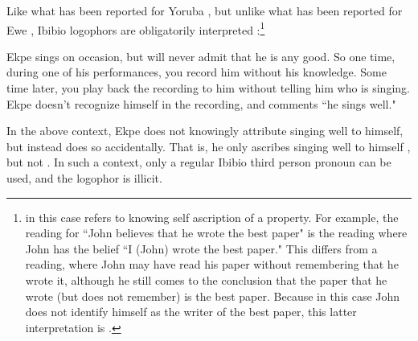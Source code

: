 \documentclass[output=paper]{langscibook}
\begin{document}
Like what has been reported for Yoruba \citep{Adesola2005,Anand2006}, but unlike what has been reported for Ewe \citep{Pearson2015}, Ibibio logophors are obligatorily interpreted :\footnote{ in this case refers to knowing self ascription of a property. For example, the  reading for ``John believes that he wrote the best paper" is the reading where John has the belief ``I (John) wrote the best paper." This differs from a  reading, where John may have read his paper without remembering that he wrote it, although he still comes to the conclusion that the paper that he wrote (but does not remember) is the best paper. Because in this case John does not identify himself as the writer of the best paper, this latter interpretation is .}
\begin{context}
		Ekpe sings on occasion, but will never admit that he is any good. So one time, during one of his performances, you record him without his knowledge. Some time later, you play back the recording to him without telling him who is singing. Ekpe doesn't recognize himself in the recording, and comments ``he sings well."
		\end{context}
		\begin{exe}
		
		\ex \begin{xlist}
	\end{xlist}
	\end{exe}
In the above context, Ekpe does not knowingly attribute singing well to himself, but instead does so accidentally. That is, he only ascribes singing well to himself , but not . In such a context, only a regular Ibibio third person pronoun can be used, and the logophor is illicit.
	
\end{document}
